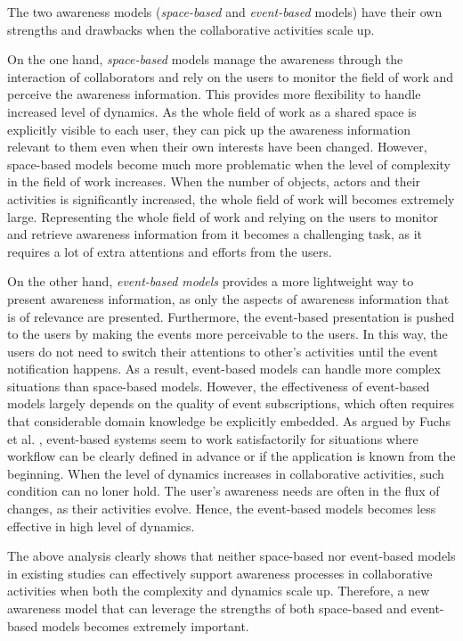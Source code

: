 The two awareness models (\emph{space-based} and \emph{event-based} models) have their own strengths and drawbacks when the collaborative activities scale up. 

On the one hand, \emph{space-based} models manage the awareness through the interaction of collaborators and rely on the users to monitor the field of work and perceive the awareness information. This provides more flexibility to handle increased level of dynamics. As the whole field of work as a shared space is explicitly visible to each user, they can pick up the awareness information relevant to them even when their own interests have been changed. However, space-based models become much more problematic when the level of complexity in the field of work increases. When the number of objects, actors and their activities is significantly increased, the whole field of work will becomes extremely large. Representing the whole field of work and relying on the users to monitor and retrieve awareness information from it becomes a challenging task, as it requires a lot of extra attentions and efforts from the users. 
 
On the other hand, \emph{event-based models} provides a more lightweight way to present awareness information, as only the aspects of awareness information that is of relevance are presented. Furthermore, the event-based presentation is pushed to the users by making the events more perceivable to the users. In this way, the users do not need to switch their attentions to other's activities until the event notification happens. As a result, event-based models can handle more complex situations than space-based models. However, the effectiveness of event-based models largely depends on the quality of event subscriptions, which often requires that considerable domain knowledge be explicitly embedded. As argued by Fuchs et al. \cite{fuchs1999a}, event-based systems seem to work satisfactorily for situations where workflow can be clearly defined in advance or if the application is known from the beginning. When the level of dynamics increases in collaborative activities, such condition can no loner hold. The user's awareness needs are often in the flux of changes, as their activities evolve. Hence, the event-based models becomes less effective in high level of dynamics.

The above analysis clearly shows that neither space-based nor event-based models in existing studies can effectively support awareness processes in collaborative activities when both the complexity and dynamics scale up. Therefore, a new awareness model that can leverage the strengths of both space-based and event-based models becomes extremely important.

